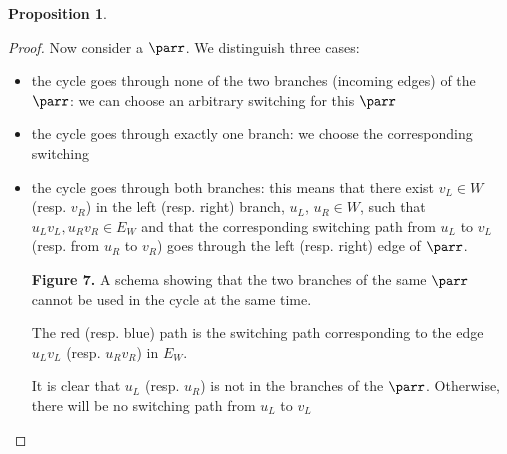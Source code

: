 \documentclass[conference]{IEEEtran}
\theoremstyle{definition}
\newtheorem{proposition}[thm]{Proposition}
\begin{document}
\begin{proposition}
\begin{proof}
  Now consider a $\parr$. We distinguish three cases:
  \begin{itemize}
    \item the cycle goes through none of the two branches (incoming edges) of
	    the $\parr$: we can choose an
	    arbitrary switching for this $\parr$
    \item the cycle goes through exactly one branch: we choose the corresponding
	    switching
    \item the cycle goes through both branches:
	    this means that there exist $v_L \in W$ (resp. $v_R$) in the left
		  (resp. right) branch, $u_L$, $u_R \in W$, such that
		  $u_Lv_L, u_Rv_R \in E_W$ and that the corresponding switching path from $u_L$ to $v_L$ (resp. from $u_R$ to $v_R$) goes through the left (resp. right) edge of $\parr$.
		  
    \begin{center}	
    
    {\bf Figure 7.} A schema showing that the two branches of the same $\parr$ cannot be used in the cycle at the same time. 
    \end{center}
    
    The red (resp. blue) path is the switching path corresponding to the edge $u_Lv_L$ (resp. $u_Rv_R$) in $E_W$.  
    
    It is clear that $u_L$ (resp. $u_R$) is not in the branches of the
	 $\parr$. Otherwise, there will be no switching path from $u_L$ to $v_L$ 


\end{itemize}
\end{proof}
\end{proposition}
\end{document}
